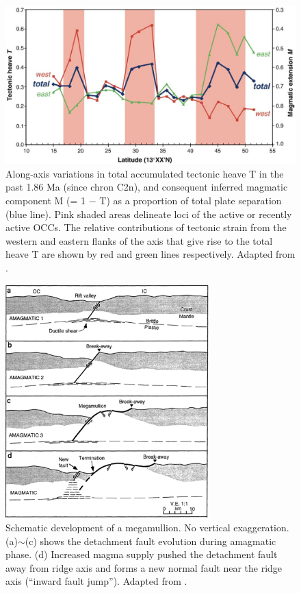 \documentclass[draft,gc]{agutex}
\begin{document}
\begin{figure}[h]
\noindent\includegraphics[width=1\textwidth]{./Figures/fig_Discussion_ResultsSummary_MacLeod2009.eps}
 \caption[Field observation results adapted from \citep{MacLeod2009}.]{Along-axis variations in total accumulated tectonic heave T in the past 1.86 Ma (since chron C2n), and consequent inferred magmatic component M (= 1 $-$ T) as a proportion of total plate separation (blue line). Pink shaded areas delineate loci of the active or recently active OCCs. The relative contributions of tectonic strain from the western and eastern flanks of the axis that give rise to the total heave T are shown by red and green lines respectively. Adapted from \citep{MacLeod2009}. }
 \label{fig_Discussion_ResultsSummary_MacLeod2009}
\end{figure}

\begin{figure}[h]
\noindent\includegraphics[width=0.7\textwidth]{./Figures/fig_Discussion_Observation_1_Tucholke1998.eps}
 \caption[Schematic development of a megamullion from amagmatic to magmatic, adapted from \citep{Tucholke1998}.]{Schematic development of a megamullion. No vertical exaggeration. (a)$\sim$(c) shows the detachment fault evolution during amagmatic phase. (d) Increased magma supply pushed the detachment fault away from ridge axis and forms a new normal fault near the ridge axis (``inward fault jump''). Adapted from \citep{Tucholke1998}.}
 \label{fig_Discussion_Observation_1_Tucholke1998}
\end{figure}
\end{document}
